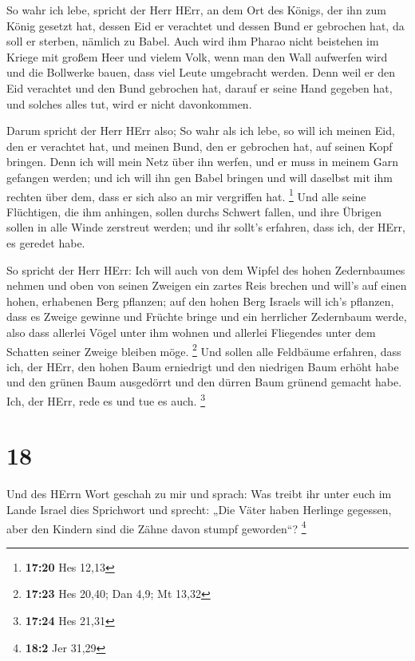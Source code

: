  So wahr ich lebe, spricht der Herr HErr, an dem Ort des
Königs, der ihn zum König gesetzt hat, dessen Eid er verachtet und
dessen Bund er gebrochen hat, da soll er sterben, nämlich zu Babel.
 Auch wird ihm Pharao nicht beistehen im Kriege mit großem
Heer und vielem Volk, wenn man den Wall aufwerfen wird und die Bollwerke
bauen, dass viel Leute umgebracht werden.  Denn weil er den
Eid verachtet und den Bund gebrochen hat, darauf er seine Hand gegeben
hat, und solches alles tut, wird er nicht davonkommen.

 Darum spricht der Herr HErr also; So wahr als ich lebe, so
will ich meinen Eid, den er verachtet hat, und meinen Bund, den er
gebrochen hat, auf seinen Kopf bringen.  Denn ich will mein
Netz über ihn werfen, und er muss in meinem Garn gefangen werden; und
ich will ihn gen Babel bringen und will daselbst mit ihm rechten über
dem, dass er sich also an mir vergriffen hat. \footnote{\textbf{17:20}
  Hes 12,13}  Und alle seine Flüchtigen, die ihm anhingen,
sollen durchs Schwert fallen, und ihre Übrigen sollen in alle Winde
zerstreut werden; und ihr sollt's erfahren, dass ich, der HErr, es
geredet habe.

 So spricht der Herr HErr: Ich will auch von dem Wipfel des
hohen Zedernbaumes nehmen und oben von seinen Zweigen ein zartes Reis
brechen und will's auf einen hohen, erhabenen Berg pflanzen;
 auf den hohen Berg Israels will ich's pflanzen, dass es
Zweige gewinne und Früchte bringe und ein herrlicher Zedernbaum werde,
also dass allerlei Vögel unter ihm wohnen und allerlei Fliegendes unter
dem Schatten seiner Zweige bleiben möge. \footnote{\textbf{17:23} Hes
  20,40; Dan 4,9; Mt 13,32}  Und sollen alle Feldbäume
erfahren, dass ich, der HErr, den hohen Baum erniedrigt und den
niedrigen Baum erhöht habe und den grünen Baum ausgedörrt und den dürren
Baum grünend gemacht habe. Ich, der HErr, rede es und tue es auch.
\footnote{\textbf{17:24} Hes 21,31}

\hypertarget{section-5}{%
\section{18}\label{section-5}}

 Und des HErrn Wort geschah zu mir und sprach: 
Was treibt ihr unter euch im Lande Israel dies Sprichwort und sprecht:
„Die Väter haben Herlinge gegessen, aber den Kindern sind die Zähne
davon stumpf geworden``? \footnote{\textbf{18:2} Jer 31,29}

